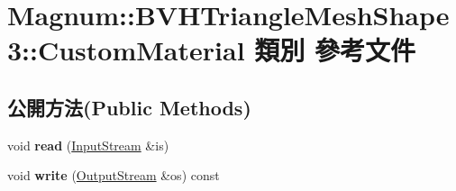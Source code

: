 \hypertarget{class_magnum_1_1_b_v_h_triangle_mesh_shape3_1_1_custom_material}{}\section{Magnum\+:\+:B\+V\+H\+Triangle\+Mesh\+Shape3\+:\+:Custom\+Material 類別 參考文件}
\label{class_magnum_1_1_b_v_h_triangle_mesh_shape3_1_1_custom_material}
\subsection*{公開方法(Public Methods)}
\begin{DoxyCompactItemize}
\item 
void {\bfseries read} (\hyperlink{class_magnum_1_1_input_stream}{Input\+Stream} \&is)\hypertarget{class_magnum_1_1_b_v_h_triangle_mesh_shape3_1_1_custom_material_ae4f17c3e653a3798a7669817b1623742}{}\label{class_magnum_1_1_b_v_h_triangle_mesh_shape3_1_1_custom_material_ae4f17c3e653a3798a7669817b1623742}

\item 
void {\bfseries write} (\hyperlink{class_magnum_1_1_output_stream}{Output\+Stream} \&os) const \hypertarget{class_magnum_1_1_b_v_h_triangle_mesh_shape3_1_1_custom_material_a66faa3aef4357e6a59159525663899e4}{}\label{class_magnum_1_1_b_v_h_triangle_mesh_shape3_1_1_custom_material_a66faa3aef4357e6a59159525663899e4}

\end{DoxyCompactItemize}
